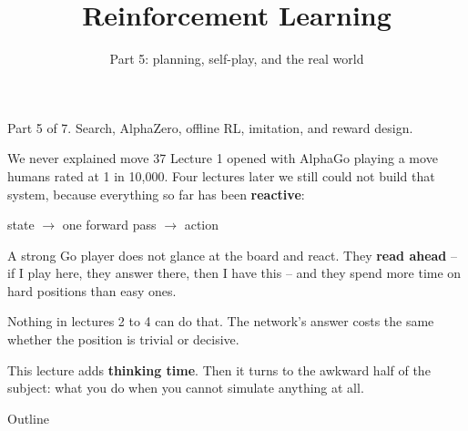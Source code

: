\documentclass[aspectratio=169]{beamer}
\title{Reinforcement Learning}
\subtitle{Part 5: planning, self-play, and the real world}
\author{}
\date{}
\begin{document}
\begin{frame}
  \titlepage
  \begin{center}\scriptsize\color{gray}
    Part 5 of 7. Search, AlphaZero, offline RL, imitation, and reward design.
  \end{center}
\end{frame}

\begin{frame}{We never explained move 37}
  \small
  Lecture 1 opened with AlphaGo playing a move humans rated at 1 in 10{,}000. Four lectures
  later we still could not build that system, because everything so far has been
  \textbf{reactive}:

  \vskip 6pt
  \begin{center}
  \begin{tcolorbox}[colback=lightbg, colframe=popblue, boxrule=0.7pt, arc=2pt, width=0.78\textwidth]
    \begin{center}
      \small state $\longrightarrow$ one forward pass $\longrightarrow$ action
    \end{center}
  \end{tcolorbox}
  \end{center}

  \vskip 8pt
  \begin{tcolorbox}[colback=armorange!12, colframe=armorange, boxrule=0.7pt, arc=2pt]
    \small
    A strong Go player does not glance at the board and react. They \textbf{read ahead} -- if I
    play here, they answer there, then I have this -- and they spend more time on hard positions
    than easy ones.

    \vskip 4pt
    Nothing in lectures 2 to 4 can do that. The network's answer costs the same whether the
    position is trivial or decisive.
  \end{tcolorbox}

  \vskip 8pt
  \begin{center}
    \small
    This lecture adds \textbf{thinking time}. Then it turns to the awkward half of the
    subject: what you do when you cannot simulate anything at all.
  \end{center}
\end{frame}

\begin{frame}{Outline}
  \tableofcontents
\end{frame}
\end{document}

